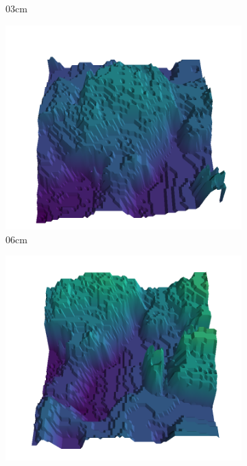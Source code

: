 \documentclass[../document.tex]{subfiles}
\begin{document}
\begin{figure}[H]
\begin{subfigure}[b]{0.19\textwidth}
        \caption{$03$cm}
        \end{subfigure}
        \begin{subfigure}[b]{0.19\textwidth}
        \includegraphics[width=\linewidth]{../img/5/quarry/all/worst/06-patch-3d-majavi-colormap-6.png}
        \caption{$06$cm}
        \end{subfigure}
        \begin{subfigure}[b]{0.19\textwidth}
        \includegraphics[width=\linewidth]{../img/5/quarry/all/worst/06-patch-3d-majavi-colormap-7.png}

\end{subfigure}
\end{figure}
\end{document}
